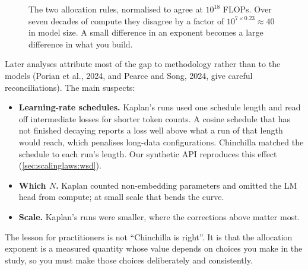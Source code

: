 \begin{figure}[t]
\centering
{}
\caption{The two allocation rules, normalised to agree at $10^{18}$ FLOPs. Over seven decades of
compute they disagree by a factor of $10^{7\times0.23}\approx 40$ in model size. A small
difference in an exponent becomes a large difference in what you build.}
\label{fig:scalinglaws:kaplan}
\end{figure}

Later analyses attribute most of the gap to methodology rather than to the models (Porian et
al., 2024, and Pearce and Song, 2024, give careful reconciliations). The main suspects:
\begin{itemize}
  \item \textbf{Learning-rate schedules.} Kaplan's runs used one schedule length and read off
        intermediate losses for shorter token counts. A cosine schedule that has not finished
        decaying reports a loss well above what a run of that length would reach, which
        penalises long-data configurations. Chinchilla matched the schedule to each run's length.
        Our synthetic API reproduces this effect (\cref{sec:scalinglaws:wsd}).
  \item \textbf{Which $N$.} Kaplan counted non-embedding parameters and omitted the LM head from
        compute; at small scale that bends the curve.
  \item \textbf{Scale.} Kaplan's runs were smaller, where the corrections above matter most.
\end{itemize}
The lesson for practitioners is not ``Chinchilla is right''. It is that the allocation exponent
is a measured quantity whose value depends on choices you make in the study, so you must make
those choices deliberately and consistently.

